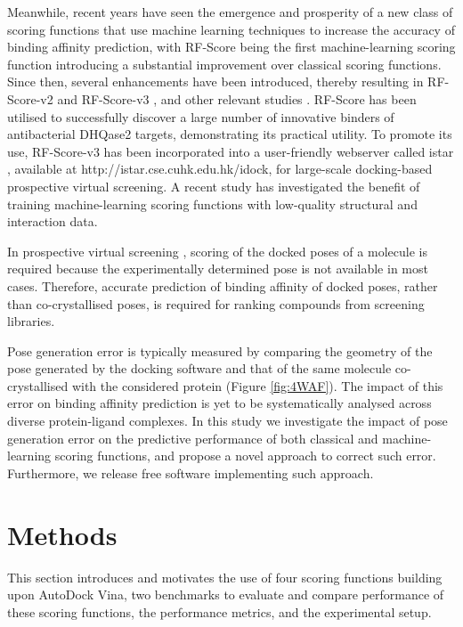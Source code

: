 \documentclass[twocolumn]{bmcart}
\begin{document}
Meanwhile, recent years have seen the emergence and prosperity of a new class of scoring functions that use machine learning techniques to increase the accuracy of binding affinity prediction, with RF-Score \cite{564} being the first machine-learning scoring function introducing a substantial improvement over classical scoring functions. Since then, several enhancements have been introduced, thereby resulting in RF-Score-v2 \cite{1370} and RF-Score-v3 \cite{1647}, and other relevant studies \cite{1432}. RF-Score has been utilised \cite{1281} to successfully discover a large number of innovative binders of antibacterial DHQase2 targets, demonstrating its practical utility. To promote its use, RF-Score-v3 has been incorporated into a user-friendly webserver called istar \cite{1362}, available at http://istar.cse.cuhk.edu.hk/idock, for large-scale docking-based prospective virtual screening. A recent study \cite{1663} has investigated the benefit of training machine-learning scoring functions with low-quality structural and interaction data.

In prospective virtual screening \cite{1362}, scoring of the docked poses of a molecule is required because the experimentally determined pose is not available in most cases. Therefore, accurate prediction of binding affinity of docked poses, rather than co-crystallised poses, is required for ranking compounds from screening libraries.

Pose generation error is typically measured by comparing the geometry of the pose generated by the docking software and that of the same molecule co-crystallised with the considered protein (Figure \ref{fig:4WAF}). The impact of this error on binding affinity prediction is yet to be systematically analysed across diverse protein-ligand complexes. In this study we investigate the impact of pose generation error on the predictive performance of both classical and machine-learning scoring functions, and propose a novel approach to correct such error. Furthermore, we release free software implementing such approach.

\section*{Methods}

This section introduces and motivates the use of four scoring functions building upon AutoDock Vina, two benchmarks to evaluate and compare performance of these scoring functions, the performance metrics, and the experimental setup.
\end{document}
